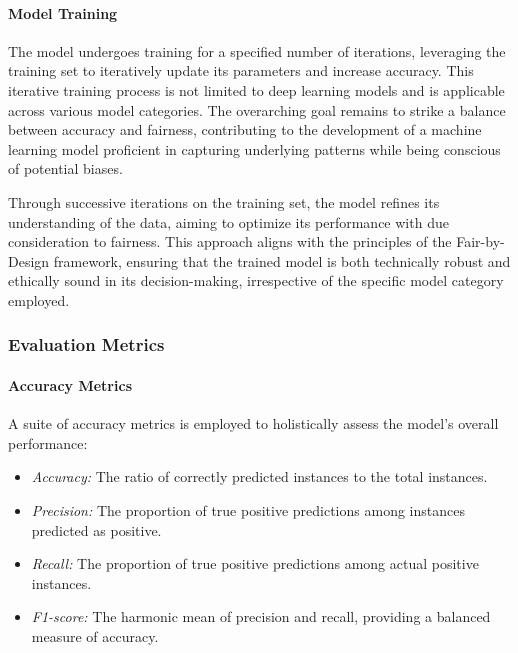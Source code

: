\paragraph{Model Training}

The model undergoes training for a specified number of iterations, leveraging the training set to iteratively update its parameters and increase accuracy. This iterative training process is not limited to deep learning models and is applicable across various model categories. The overarching goal remains to strike a balance between accuracy and fairness, contributing to the development of a machine learning model proficient in capturing underlying patterns while being conscious of potential biases.

Through successive iterations on the training set, the model refines its understanding of the data, aiming to optimize its performance with due consideration to fairness. This approach aligns with the principles of the Fair-by-Design framework, ensuring that the trained model is both technically robust and ethically sound in its decision-making, irrespective of the specific model category employed.

\subsubsection{Evaluation Metrics}

\paragraph{Accuracy Metrics}

A suite of accuracy metrics is employed to holistically assess the model's overall performance:

\begin{itemize}
    \item \emph{Accuracy:} The ratio of correctly predicted instances to the total instances.
    
    \item \emph{Precision:} The proportion of true positive predictions among instances predicted as positive.
    
    \item \emph{Recall:} The proportion of true positive predictions among actual positive instances.
    
    \item \emph{F1-score:} The harmonic mean of precision and recall, providing a balanced measure of accuracy.
\end{itemize}

